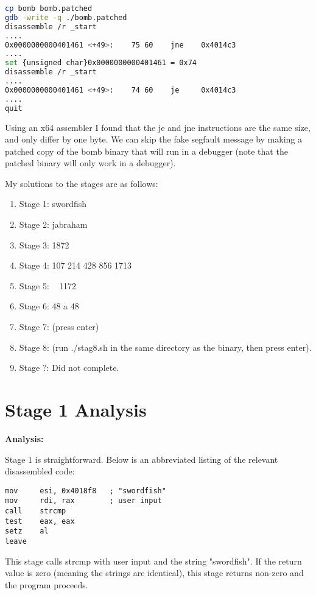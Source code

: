 \documentclass{article}
\begin{document}
\begin{lstlisting}[language=bash]
cp bomb bomb.patched
gdb -write -q ./bomb.patched
disassemble /r _start
....
0x0000000000401461 <+49>:    75 60    jne    0x4014c3
....
set {unsigned char}0x0000000000401461 = 0x74
disassemble /r _start
....
0x0000000000401461 <+49>:    74 60    je     0x4014c3
....
quit
\end{lstlisting}

\par
Using an x64 assembler I found that the je and jne instructions are the same
size, and only differ by one byte.  We can skip the fake segfault message by
making a patched copy of the bomb binary that will run in a debugger (note 
that the patched binary will only work in a debugger).

\par
My solutions to the stages are as follows:

\begin{enumerate}
  \item Stage 1: swordfish
  \item Stage 2: jabraham
  \item Stage 3: 1872
  \item Stage 4: 107 214 428 856 1713
  \item Stage 5: ~ 1172 ~
  \item Stage 6: 48 a 48
  \item Stage 7: (press enter)
  \item Stage 8: (run ./stag8.sh in the same directory as the binary, then 
  press enter).
  \item Stage ?: Did not complete.
\end{enumerate}

\newpage
\section{Stage 1 Analysis}
\begin{flushleft}
\vspace{.5pc}
\end{flushleft}

\begin{flushleft}
\textbf{Analysis:}
\vspace{.5pc}
\end{flushleft}

\par
Stage 1 is straightforward.  Below is an abbreviated listing of the relevant
disassembled code:
\begin{lstlisting}
mov     esi, 0x4018f8   ; "swordfish"
mov     rdi, rax        ; user input
call    strcmp
test    eax, eax
setz    al
leave
\end{lstlisting}
\par
This stage calls strcmp with user input and the string "swordfish".  If the 
return value is zero (meaning the strings are identical), this stage returns 
non-zero and the program proceeds.
\end{document}
